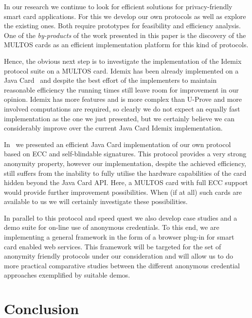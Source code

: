 In our research we continue to look for efficient solutions for
privacy-friendly smart card applications. For this we develop our own
protocols as well as explore the existing ones. Both require
prototypes for feasibility and efficiency analysis. One of the
\emph{by-products} of the work presented in this paper is the
discovery of the MULTOS cards as an efficient implementation platform
for this kind of protocols.

Hence, the obvious next step is to investigate the implementation of
the Idemix protocol suite on a MULTOS card. Idemix has been already
implemented on a Java Card~\cite{BichselCGS2009} and despite the best effort of the
implementers to maintain reasonable efficiency the running times still leave
room for improvement in our opinion. Idemix has more features and is more complex than
U-Prove and more involved computations are required, so clearly we do
not expect an equally fast implementation as the one we just
presented, but we certainly believe we can considerably improve over
the current Java Card Idemix implementation.

In~\cite{BatinaHJMV10,HoepmanJV10} we presented an efficient Java Card
implementation of our
own protocol based on ECC and self-blindable signatures. This protocol
provides a very strong anonymity property, however our implementation,
despite the achieved efficiency, still suffers from the inability to
fully utilise the hardware capabilities of the card hidden beyond the
Java Card API. Here, a MULTOS card with full ECC support would provide
further improvement possibilities. When (if at all) such cards are
available to us we will certainly investigate these possibilities.

In parallel to this protocol and speed quest we also develop case
studies and a demo suite for on-line use of anonymous credentials. To
this end, we are implementing a general framework in the form of a
browser plug-in for smart card enabled web services. This framework
will be targeted for the set of anonymity friendly protocols under our
consideration and will allow us to do more practical comparative
studies between the different anonymous credential approaches
exemplified by suitable demos.

\section{Conclusion}\label{sec:conclusion}

